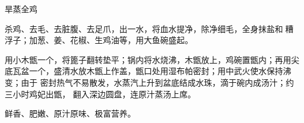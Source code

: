 \begin{recipe}{旱蒸全鸡}

\ingredients


\preparation

\step 杀鸡、去毛、去脏腹、去足爪，出一水，将血水提净，除净细毛，全身抹盐和𰪿糟
浮子；加葱、姜、花椒、生鸡油等，用大鱼碗盛起。

\step 用小木甑一个，将篦子翻转垫平；锅内将水烧沸，木甑放上，鸡碗置甑内；再用尖
底瓦盆一个，盛清水放木甑上作盖，甑口处用湿布帕密封；用中武火使水保持沸变；由于
密封热气不易散发，水蒸汽上升到盆底结成水珠，滴于碗内成汤汁；约三小时鸡妃出甑，
翻入深边圆盘，连原汁蒸汤上席。

\features

鲜香、肥嫩、原汁原味、极富营养。

\end{recipe}

